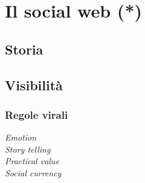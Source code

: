 
\chapter{Il social web (*)}

	\section{Storia}
	
	\section{Visibilità}
	
		\subsection{Regole virali}
			
			\begin{description}
				\item[\emph{Emotion}]
				\item[\emph{Story telling}]
				\item[\emph{Practical value}]
				\item[\emph{Social currency}]
			\end{description}